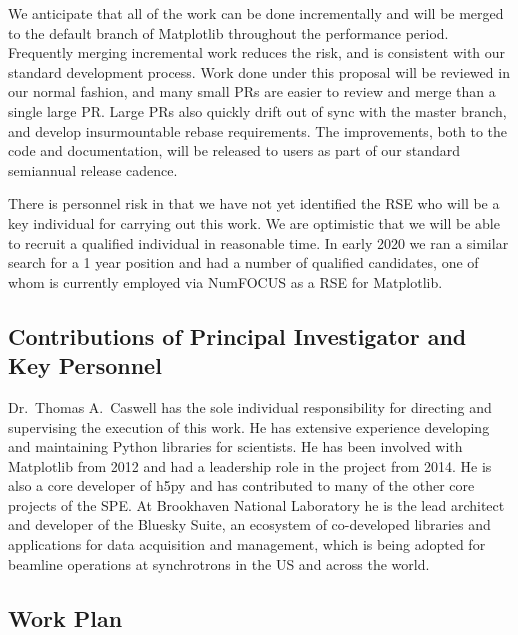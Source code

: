 \documentclass[12pt]{article}
\numberwithin{page}{section}
\begin{document}
We anticipate that all of the work can be done incrementally and will
be merged to the default branch of Matplotlib throughout the
performance period.  Frequently merging incremental work reduces the
risk, and is consistent with our standard development process.  Work
done under this proposal will be reviewed in our normal fashion, and many
small PRs are easier to review and merge than a single large PR.
Large PRs also quickly drift out of sync with the master branch, and
develop insurmountable rebase requirements.  The improvements, both to
the code and documentation, will be released to users as part of our
standard semiannual release cadence.

There is personnel risk in that we have not yet identified the RSE who will
be a key individual for carrying out this work.  We are optimistic that we will
be able to recruit a qualified individual in reasonable time.  In early
2020 we ran a similar search for a 1 year position and had a number of
qualified candidates, one of whom is currently employed via NumFOCUS as
a RSE for Matplotlib.

\subsection{Contributions of Principal  Investigator and Key Personnel}

Dr.\ Thomas A.\ Caswell has the sole individual responsibility for
directing and supervising the execution of this work.  He has
extensive experience developing and maintaining Python libraries for
scientists.  He has been involved with Matplotlib from 2012 and had a
leadership role in the project from 2014.  He is also a core developer
of h5py and has contributed to many of the other core projects of the
SPE.  At Brookhaven National Laboratory he is the lead architect and
developer of the Bluesky Suite, an ecosystem of co-developed libraries
and applications for data acquisition and management, which is being
adopted for beamline operations at synchrotrons in the US and across
the world.


\subsection{Work Plan}
\end{document}
